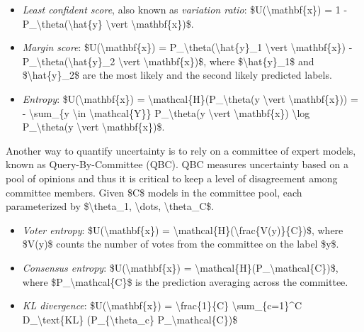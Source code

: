 \begin{itemize}
\tightlist
\item
  \emph{Least confident score}, also known as \emph{variation ratio}: \$U(\textbackslash mathbf\{x\}) = 1 - P\_\textbackslash theta(\textbackslash hat\{y\} \textbackslash vert \textbackslash mathbf\{x\})\$.
\item
  \emph{Margin score}: \$U(\textbackslash mathbf\{x\}) = P\_\textbackslash theta(\textbackslash hat\{y\}\_1 \textbackslash vert \textbackslash mathbf\{x\}) - P\_\textbackslash theta(\textbackslash hat\{y\}\_2 \textbackslash vert \textbackslash mathbf\{x\})\$, where \$\textbackslash hat\{y\}\_1\$ and \$\textbackslash hat\{y\}\_2\$ are the most likely and the second likely predicted labels.
\item
  \emph{Entropy}: \$U(\textbackslash mathbf\{x\}) = \textbackslash mathcal\{H\}(P\_\textbackslash theta(y \textbackslash vert \textbackslash mathbf\{x\})) = - \textbackslash sum\_\{y \textbackslash in \textbackslash mathcal\{Y\}\} P\_\textbackslash theta(y \textbackslash vert \textbackslash mathbf\{x\}) \textbackslash log P\_\textbackslash theta(y \textbackslash vert \textbackslash mathbf\{x\})\$.
\end{itemize}

Another way to quantify uncertainty is to rely on a committee of expert models, known as Query-By-Committee (QBC). QBC measures uncertainty based on a pool of opinions and thus it is critical to keep a level of disagreement among committee members. Given \$C\$ models in the committee pool, each parameterized by \$\textbackslash theta\_1, \textbackslash dots, \textbackslash theta\_C\$.

\begin{itemize}
\tightlist
\item
  \emph{Voter entropy}: \$U(\textbackslash mathbf\{x\}) = \textbackslash mathcal\{H\}(\textbackslash frac\{V(y)\}\{C\})\$, where \$V(y)\$ counts the number of votes from the committee on the label \$y\$.
\item
  \emph{Consensus entropy}: \$U(\textbackslash mathbf\{x\}) = \textbackslash mathcal\{H\}(P\_\textbackslash mathcal\{C\})\$, where \$P\_\textbackslash mathcal\{C\}\$ is the prediction averaging across the committee.
\item
  \emph{KL divergence}: \$U(\textbackslash mathbf\{x\}) = \textbackslash frac\{1\}\{C\} \textbackslash sum\_\{c=1\}\^{}C D\_\textbackslash text\{KL\} (P\_\{\textbackslash theta\_c\} \textbar{} P\_\textbackslash mathcal\{C\})\$
\end{itemize}

